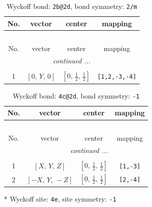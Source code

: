 \documentclass[fleqn,8pt]{jsarticle}
\begin{document}
\renewcommand{\arraystretch}{1.2}
\begin{longtable}{cccc}
\caption{Wyckoff bond: {\tt 2b@2d}, bond symmetry: {\tt 2/m}}
 \\
 \hline \hline
No. & vector & center & mapping \\ \hline \endfirsthead

\multicolumn{3}{l}{\tablename\ \thetable{}} \\
 \hline \hline
No. & vector & center & mapping \\ \hline \endhead

 \hline \hline
\multicolumn{3}{r}{\footnotesize\it continued ...} \\ \endfoot

 \hline \hline
\multicolumn{3}{r}{} \\ \endlastfoot

1 & $\left[ 0,\, Y,\, 0 \right]$ & $\left[ 0,\, \frac{1}{2},\, \frac{1}{2} \right]$ & {\tt [1,2,-3,-4]} \\
\end{longtable}
\renewcommand{\arraystretch}{1.2}
\begin{longtable}{cccc}
\caption{Wyckoff bond: {\tt 4c@2d}, bond symmetry: {\tt -1}}
 \\
 \hline \hline
No. & vector & center & mapping \\ \hline \endfirsthead

\multicolumn{3}{l}{\tablename\ \thetable{}} \\
 \hline \hline
No. & vector & center & mapping \\ \hline \endhead

 \hline \hline
\multicolumn{3}{r}{\footnotesize\it continued ...} \\ \endfoot

 \hline \hline
\multicolumn{3}{r}{} \\ \endlastfoot

1 & $\left[ X,\, Y,\, Z \right]$ & $\left[ 0,\, \frac{1}{2},\, \frac{1}{2} \right]$ & {\tt [1,-3]} \\ \hline
2 & $\left[ - X,\, Y,\, - Z \right]$ & $\left[ 0,\, \frac{1}{2},\, \frac{1}{2} \right]$ & {\tt [2,-4]} \\
\end{longtable}
* Wyckoff site: {\tt 4e}, site symmetry: {\tt -1}
\renewcommand{\arraystretch}{1.2}
\end{document}
